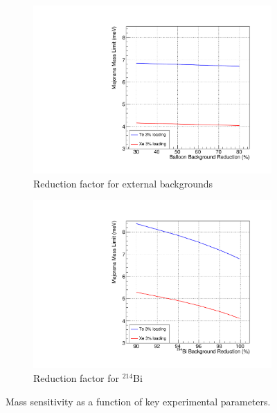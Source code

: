\begin{figure}
\begin{subfigure}[b]{0.49\textwidth}
 \includegraphics[width=\textwidth]{dbd/externals_reduction.pdf}
 \caption{Reduction factor for external backgrounds}
 \label{fig:scale-ext}
\end{subfigure}
\begin{subfigure}[b]{0.49\textwidth}
 \includegraphics[width=\textwidth]{dbd/bi214_reduction.pdf}
 \caption{Reduction factor for $^{214}$Bi}
 \label{fig:scale-bi214}
\end{subfigure}
\caption{Mass sensitivity as a function of key experimental parameters.}
\label{fig:scaling-plots}
\end{figure}

